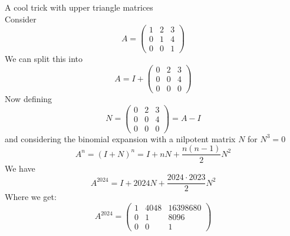 \documentclass[journal, letterpaper]{IEEEtran}
\begin{document}
    \begin{myboxg}{A cool trick with upper triangle matrices} \\
        Consider 
        $$ A = \begin{pmatrix}
            1 & 2 & 3 \\ 0 & 1 & 4 \\ 0 & 0 & 1
        \end{pmatrix}$$ 
        We can split this into 
        $$ A = I + \begin{pmatrix}
            0 & 2 & 3 \\ 0 & 0 & 4 \\ 0 & 0 & 0
        \end{pmatrix}
        $$
        Now defining 
        $$ 
        N = \begin{pmatrix}
            0 & 2 & 3 \\ 0 & 0 & 4 \\ 0 & 0 & 0
        \end{pmatrix} = A - I
        $$
        and considering the binomial expansion with a nilpotent matrix $N$ for $N^3 = 0$
        $$
            A^{n} = (I + N)^n = I + nN + \frac{n(n-1)}{2}N^2
        $$
        We have
        $$
            A^{2024} = I + 2024N + \frac{2024 \cdot 2023}{2}N^2
        $$
        Where we get:
        $$
            A^{2024} = \begin{pmatrix}
                1 & 4048 & 16398680 \\
                0 & 1 & 8096 \\
                0 & 0 & 1
            \end{pmatrix}
        $$
    \end{myboxg}
\end{document}

